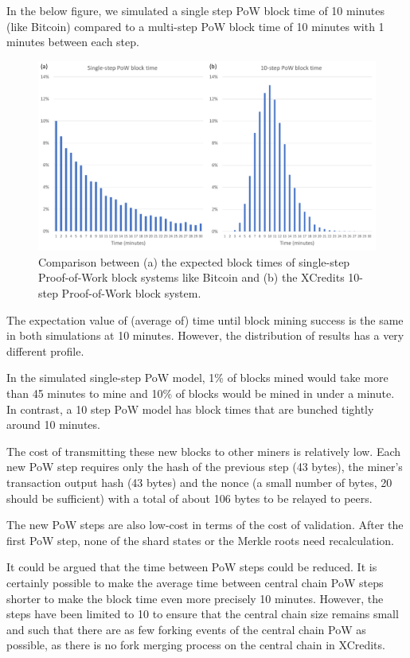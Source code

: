 \documentclass[a4paper,12pt]{article}
\begin{document}
In the below figure, we simulated a single step PoW block time of 10 minutes (like Bitcoin) compared to a multi-step PoW block time of 10 minutes with 1 minutes between each step. 

\begin{figure}[!htb]
  \centering
  \includegraphics[page=1,width=.95\textwidth]{multi-step-pow} 
  \caption{Comparison between (a) the expected block times of single-step 
    Proof-of-Work block systems like Bitcoin and (b) the XCredits 10-step 
    Proof-of-Work block system. }
  \label{fig:multi-step-pow}
\end{figure}
\FloatBarrier

The expectation value of (average of) time until block mining success is the same in both simulations at 10 minutes. However, the distribution of results has a very different profile. 

In the simulated single-step PoW model, 1\% of blocks mined would take more than 45 minutes to mine and 10\% of blocks would be mined in under a minute. In contrast, a 10 step PoW model has block times that are bunched tightly around 10 minutes.



The cost of transmitting these new blocks to other miners is relatively low. Each new PoW step requires only the hash of the previous step (43 bytes), the miner's transaction output hash (43 bytes) and the nonce (a small number of bytes, 20 should be sufficient) with a total of about 106 bytes to be relayed to peers.

The new PoW steps are also low-cost in terms of the cost of validation. After the first PoW step, none of the shard states or the Merkle roots need recalculation.

It could be argued that the time between PoW steps could be reduced. It is certainly possible to make the average time between central chain PoW steps shorter to make the block time even more precisely 10 minutes. However, the steps have been limited to 10 to ensure that the central chain size remains small and such that there are as few forking events of the central chain PoW as possible, as there is no fork merging process on the central chain in XCredits.
\end{document}
